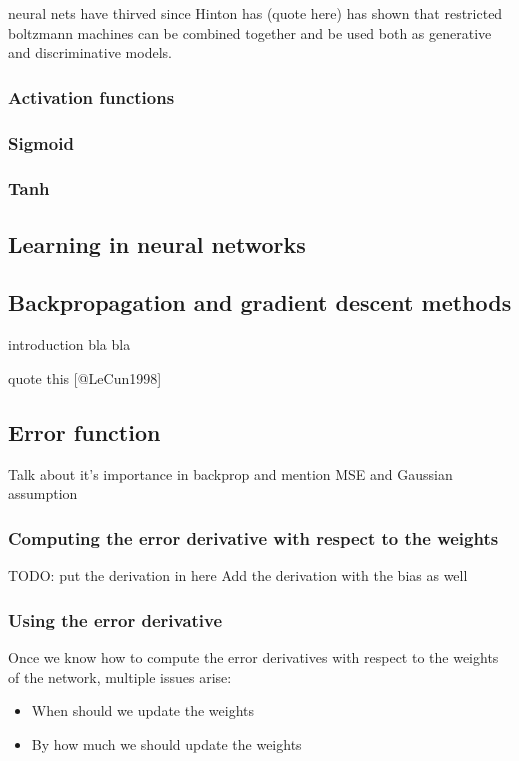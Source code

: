 \documentclass[11pt, fleqn, twoside]{article}
\begin{document}
 neural nets have thirved since Hinton has (quote here) has shown that restricted boltzmann machines can be combined together and be used both as generative and discriminative models.

\subsubsection{Activation functions}

\subsubsection{Sigmoid}

\subsubsection{Tanh}

\subsection{Learning in neural networks}

\subsection{Backpropagation and gradient descent methods}
  introduction bla bla

  quote this [@LeCun1998]

\subsection{Error function}
  Talk about it's importance in backprop and mention MSE and Gaussian assumption

\subsubsection {Computing the error derivative with respect to the weights}
  TODO: put the derivation in here
  Add the derivation with the  bias as well

\subsubsection {Using the error derivative}

  Once we know how to compute the error derivatives with respect to the weights of the network, multiple issues arise:

\begin{itemize}
    \item When should we update the weights
    \item By how much we should update the weights
\end{itemize}
\end{document}

